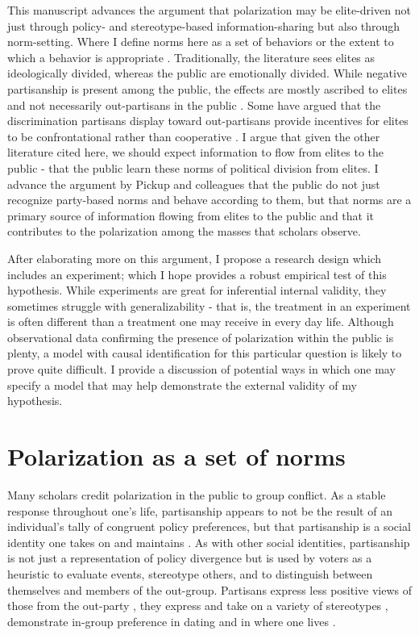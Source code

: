 \documentclass [12pt]{article}
\begin{document}
This manuscript advances the argument that polarization may be elite-driven not just through policy- and stereotype-based information-sharing but also through norm-setting. Where I define norms here as a set of behaviors or the extent to which a behavior is appropriate \citep{pickup_et-al_2020}. Traditionally, the literature sees elites as ideologically divided, whereas the public are emotionally divided. While negative partisanship is present among the public, the effects are mostly ascribed to elites and not necessarily out-partisans in the public \citep{druckman_levendusky_2019}. Some have argued that the discrimination partisans display toward out-partisans provide incentives for elites to be confrontational rather than cooperative \citep{iyengar_westwood_2015}. I argue that given the other literature cited here, we should expect information to flow from elites to the public - that the public learn these norms of political division from elites. I advance the argument by Pickup and colleagues \citep{pickup_et-al_2020} that the public do not just recognize party-based norms and behave according to them, but that norms are a primary source of information flowing from elites to the public and that it contributes to the polarization among the masses that scholars observe. 

After elaborating more on this argument, I propose a research design which includes an experiment; which I hope provides a robust empirical test of this hypothesis. While experiments are great for inferential internal validity, they sometimes struggle with generalizability - that is, the treatment in an experiment is often different than a treatment one may receive in every day life. Although observational data confirming the presence of polarization within the public is plenty, a model with causal identification for this particular question is likely to prove quite difficult. I provide a discussion of potential ways in which one may specify a model that may help demonstrate the external validity of my hypothesis.

\section{Polarization as a set of norms}

Many scholars credit polarization in the public to group conflict. As a stable response throughout one's life, partisanship appears to not be the result of an individual's tally of congruent policy preferences, but that partisanship is a social identity one takes on and maintains \citep{green_et-al_2002}. As with other social identities, partisanship is not just a representation of policy divergence but is used by voters as a heuristic to evaluate events, stereotype others, and to distinguish between themselves and members of the out-group. Partisans express less positive views of those from the out-party \citep{iyengar_westwood_2015}, they express and take on a variety of stereotypes \citep{ahler_sood_2018}, demonstrate in-group preference in dating \citep{nicholson_et-al_2016, iyengar_et-al_2019} and in where one lives \citep{liu_et-al_2019}. 
\end{document}
